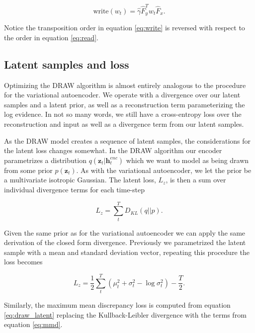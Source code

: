 \begin{equation}\label{eq:write}
\text{write}(w_t)  = \hat{\gamma} \hat{F}^T_y w_t \hat{F}_x.
\end{equation}

\noindent Notice the transposition order in equation \ref{eq:write} is reversed with respect to the order in equation \ref{eq:read}. 

\subsection{Latent samples and loss}

Optimizing the DRAW algorithm is almost entirely analogous to the procedure for the variational autoencoder. We operate with a divergence over our latent samples and a latent prior, as well as a reconstruction term parameterizing the log evidence. In not so many words, we still have a cross-entropy loss over the reconstruction and input as well as a divergence term from our latent samples.  

As the DRAW model creates a sequence of latent samples, the considerations for the latent loss changes somewhat. In the DRAW algorithm our encoder parametrizes a distribution $q(\mathbf{z}_t | \mathbf{h}_t^{enc})$ which we want to model as being drawn from some prior $p(\mathbf{z}_t)$. As with the variational autoencoder, we let the prior be a multivariate isotropic Gaussian. The latent loss, $L_z$, is then a sum over individual divergence terms for each time-step

\begin{equation}\label{eq:draw_latent}
L_z = \sum_t^T D_{KL}(q||p).
\end{equation}

\noindent Given the same prior as for the variational autoencoder we can apply the same derivation of the closed form divergence. Previously we parametrized the latent sample with a mean and standard deviation vector, repeating this procedure the loss becomes 

\begin{equation}\label{eq:draw_kl}
L_z = \frac{1}{2}\sum_t^T(\mu^2_t + \sigma^2_t - \log \sigma_t ^2) - \frac{T}{2}.
\end{equation}

\noindent Similarly, the maximum mean discrepancy loss is computed from equation \ref{eq:draw_latent} replacing the Kullback-Leibler divergence with the terms from equation \ref{eq:mmd}.